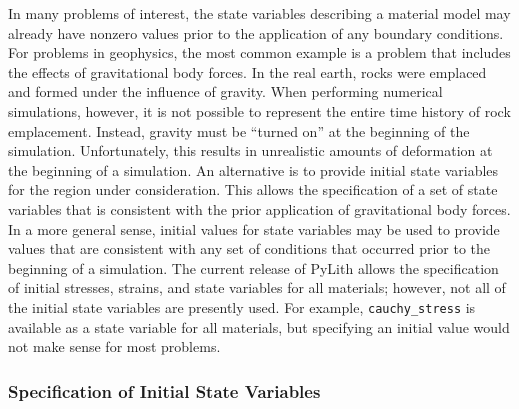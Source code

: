 In many problems of interest, the state variables describing a material
model may already have nonzero values prior to the application of
any boundary conditions. For problems in geophysics, the most common
example is a problem that includes the effects of gravitational body
forces. In the real earth, rocks were emplaced and formed under the
influence of gravity. When performing numerical simulations, however,
it is not possible to represent the entire time history of rock emplacement.
Instead, gravity must be ``turned on'' at the beginning of the simulation.
Unfortunately, this results in unrealistic amounts of deformation
at the beginning of a simulation. An alternative is to provide initial
state variables for the region under consideration. This allows the
specification of a set of state variables that is consistent with
the prior application of gravitational body forces. In a more general
sense, initial values for state variables may be used to provide values
that are consistent with any set of conditions that occurred prior
to the beginning of a simulation. The current release of PyLith allows
the specification of initial stresses, strains, and state variables
for all materials; however, not all of the initial state variables
are presently used. For example, \texttt{cauchy\_stress} is available
as a state variable for all materials, but specifying an initial value
would not make sense for most problems.


\subsubsection{Specification of Initial State Variables}


